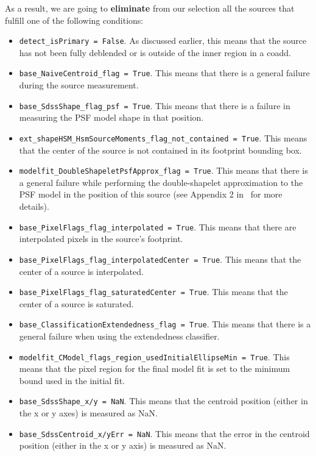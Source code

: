 \documentclass[twocolumn]{aastex62}
\begin{document}
As a result, we are going to \textbf{eliminate} from our selection all the sources that fulfill one of the following conditions:
\begin{itemize}
\item \texttt{detect\_isPrimary = False}. As discussed earlier, this means that the source has not been fully deblended or is outside of the inner region in a coadd.
\item \texttt{base\_NaiveCentroid\_flag = True}. This means that there is a general failure during the source measurement.
\item \texttt{base\_SdssShape\_flag\_psf = True}. This means that there is a failure in measuring the PSF model shape in that position.
\item \texttt{ext\_shapeHSM\_HsmSourceMoments\_flag\_not\_contained = True}. This means that the center of the source is not contained in its footprint bounding box.
\item \texttt{modelfit\_DoubleShapeletPsfApprox\_flag = True}. This means that there is a general failure while performing the double-shapelet approximation to the PSF model in the position of this source (see Appendix 2 in~\citet{2018PASJ...70S...5B} for more details).
\item \texttt{base\_PixelFlags\_flag\_interpolated = True}. This means that there are interpolated pixels in the source's footprint.
\item \texttt{base\_PixelFlags\_flag\_interpolatedCenter = True}. This means that the center of a source is interpolated.
\item \texttt{base\_PixelFlags\_flag\_saturatedCenter = True}. This means that the center of a source is saturated.
\item \texttt{base\_ClassificationExtendedness\_flag = True}. This means that there is a general failure when using the extendedness classifier.
\item \texttt{modelfit\_CModel\_flags\_region\_usedInitialEllipseMin = True}. This means that the pixel region for the final model fit is set to the minimum bound used in the initial fit.
\item \texttt{base\_SdssShape\_x/y = NaN}. This means that the centroid position (either in the x or y axes) is measured as NaN.
\item \texttt{base\_SdssCentroid\_x/yErr = NaN}. This means that the error in the centroid position (either in the x or y axis) is measured as NaN.
\end{itemize}
\end{document}
